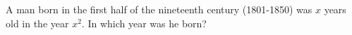 A man born in the first half of the nineteenth century (1801-1850) was $x$ years old in the year $x^2$. In which year was he born?
